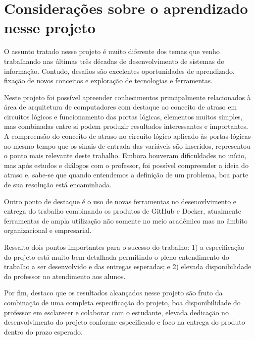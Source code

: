 
\section{Considerações sobre o aprendizado nesse projeto}

O assunto tratado nesse projeto é muito diferente dos temas que venho trabalhando nas últimas três décadas
de desenvolvimento de sistemas de informação. Contudo, desafios são excelentes oportunidades de aprendizado, 
fixação de novos conceitos e exploração de tecnologias e ferramentas.

Neste projeto foi possível apreender conhecimentos principalmente relacionados à área de arquitetura de computadores 
com destaque ao conceito de atraso em circuitos lógicos e funcionamento das portas lógicas,
elementos muitos simples, mas combinadas entre si podem produzir resultados interessantes e importantes.
A compreensão do conceito de atraso no circuito lógico aplicado às portas lógicas 
ao mesmo tempo que os sinais de entrada das variáveis são inseridos, representou 
o ponto mais relevante deste trabalho. Embora houveram dificuldades no início, mas 
após estudos e diálogos com o professor, foi possível compreender a ideia do atraso e, sabe-se  que quando entendemos 
a definição de um problema, boa parte de sua resolução está encaminhada.

Outro ponto de destaque é o uso de novas ferramentas no desenovlvimento e entrega do trabalho combinando os produtos 
de GitHub e Docker, 
atualmente ferramentas de ampla utilização não somente no meio acadêmico mas no âmbito organizacional e empresarial.

Ressalto dois pontos importantes para o sucesso do trabalho: 1) a especificação do projeto está muito bem detalhada 
permitindo o pleno entendimento do trabalho a ser desenvolvido e das entregas esperadas; e 2) elevada disponibilidade 
do professor no atendimento aos alunos.

Por fim, destaco que os resultados alcançados nesse projeto são fruto da combinação de uma completa especificação 
do projeto, boa disponibilidade do professor em esclarecer e colaborar com o estudante,
elevada dedicação no desenvolvimento do projeto conforme especificado e foco na entrega do produto dentro do prazo
esperado.

